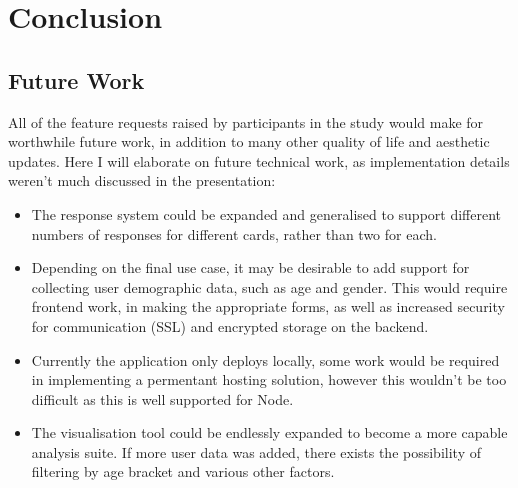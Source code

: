 \chapter{Conclusion}
\section{Future Work}
All of the feature requests raised by participants in the study would make for worthwhile future work, in addition to many other quality of life and aesthetic updates. Here I will elaborate on future technical work, as implementation details weren't much discussed in the presentation:

\begin{itemize}
    \item The response system could be expanded and generalised to support different numbers of responses for different cards, rather than two for each.
    \item Depending on the final use case, it may be desirable to add support for collecting user demographic data, such as age and gender. This would require frontend work, in making the appropriate forms, as well as increased security for communication (SSL) and encrypted storage on the backend.
    \item Currently the application only deploys locally, some work would be required in implementing a permentant hosting solution, however this wouldn't be too difficult as this is well supported for Node.
    \item The visualisation tool could be endlessly expanded to become a more capable analysis suite. If more user data was added, there exists the possibility of filtering by age bracket and various other factors.
\end{itemize}
